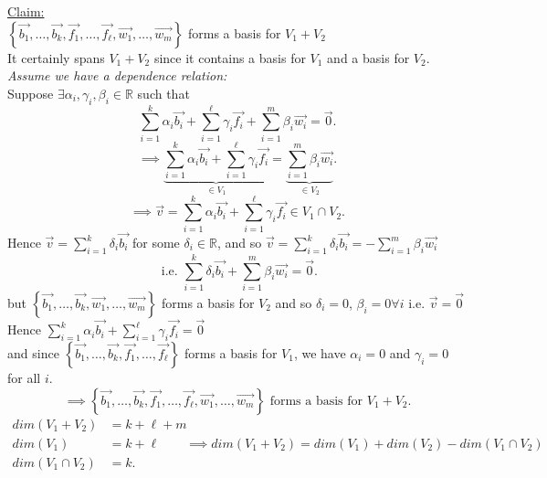 \documentclass{report}
\begin{document}
{\underline{Claim:}\\
$ \left\{ \vec{ b_1} , \ldots, \vec{ b_k} , \vec{ f_1} ,\ldots , \vec{ f_{\ell }}, \vec{ w_1} ,\ldots, \vec{ w_m}  \right\} $ forms a basis for $ V_1 + V_2$\\
It certainly spans $ V_1 + V_2$ since it contains a basis for $ V_1$ and a basis for $ V_2$.\\
\textit{Assume we have a dependence relation:}\\
Suppose $ \exists  \alpha_i , \gamma_i , \beta _i \in \mathbb{R}$ such that
\[
\sum\limits_{i=1}^{k} \alpha_i \vec{ b_i} + \sum\limits_{i=1}^{\ell} \gamma_i \vec{ f_i} + \sum\limits_{i=1}^{m} \beta_i \vec{ w_i} = \vec{ 0}
.\] 
\[
\implies   \underbrace{ \sum\limits_{i=1}^{k} \alpha_i \vec{ b_i} + \sum\limits_{i=1}^{\ell } \gamma_i \vec{ f_i} 
 }_{ \in V_1 } = \underbrace{ \sum\limits_{i=1}^{m} \beta_i \vec{ w_i} }_{ \in V_2} 
.\] 
\[
\implies \vec{ v} = \sum\limits_{i=1}^{k} \alpha_i \vec{ b_i} + \sum\limits_{i=1}^{\ell } \gamma_i \vec{ f_i}  \in V_1 \cap V_2
.\] 
Hence $ \vec{ v} = \sum\limits_{i=1}^{k} \delta_i \vec{ b_i} $ for some $ \delta_i \in \mathbb{R}$, and so $ \vec{ v} = \sum\limits_{i=1}^{k} \delta_i \vec{ b_i} = - \sum\limits_{i=1}^{m} \beta_i \vec{ w_i} 
$ 
\\
\[
\text{ i.e. }  \sum\limits_{i=1}^{k} \delta_i \vec{ b_i} + \sum\limits_{i=1}^{m} \beta_i \vec{ w_i} = \vec{ 0}
.\] 
but $ \left\{ \vec{ b_1} , \ldots, \vec{ b_k} , \vec{ w_1} ,\ldots, \vec{ w_m}  \right\} $ forms a basis for $ V_2$ and so $ \delta_i =0 $, $ \beta_i =0 \forall i$
 i.e.  $ \vec{ v} = \vec{ 0} $ \\
 Hence $ \sum\limits_{i=1}^{k} \alpha_i \vec{ b_i} + \sum\limits_{i=1}^{\ell} \gamma_i \vec{ f_i} = \vec{ 0} $\\
 and since $ \left\{ \vec{ b_1} , \ldots, \vec{ b_k} , \vec{ f_1} ,\ldots, \vec{ f_{\ell } }  \right\} $ forms a basis for $ V_1$, we have $ \alpha_i =0$ and $ \gamma_i =0$ for all $ i$.\\
 \[
\implies \left\{ \vec{ b_1} , \ldots, \vec{ b_k} , \vec{ f_1} ,\ldots, \vec{ f_{\ell }}, \vec{ w_1} ,\ldots, \vec{ w_m}  \right\} \text{ forms a basis for } V_1 + V_2
 .\] 
 \begin{align*}
 	dim \left( V_1 + V_2 \right) &= k + \ell + m\\
	dim \left( V_1 \right) &= k + \ell \qquad  \implies dim \left( V_1 + V_2 \right) = dim \left( V_1 \right) + dim \left( V_2 \right) - dim \left( V_1 \cap V_2 \right)\\
	dim \left( V_1 \cap V_2 \right) &= k
 .\end{align*}
}
\end{document}
